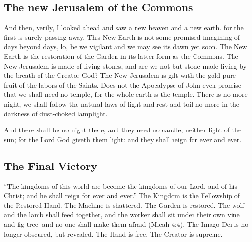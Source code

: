 \subsection{The new Jerusalem of the Commons}

And then, verily, I looked ahead and saw a new heaven and a new earth. for the first is surely passing away.
This New Earth is not some promised imagining of days beyond days, lo, be we vigilant and we may see its dawn yet soon.
The New Earth is the restoration of the Garden in its latter form as the Commons.
The New Jerusalem is made of living stones, and are we not but stone made living by the breath of the Creator God?
The New Jerusalem is gilt with the gold-pure fruit of the labors of the Saints.
Does not the Apocalypse of John even promise that we shall need no temple, for the whole earth is the temple.
There is no more night, we shall follow the natural laws of light and rest and toil no more in the darkness of dust-choked lamplight.
\begin{scripture}[Rev. 22:5]
    And there shall be no night there; and they need no candle, neither light of the sun; for the Lord God giveth them light: and they shall reign for ever and ever.
\end{scripture}

\subsection{The Final Victory}
``The kingdoms of this world are become the kingdoms of our Lord, and of his Christ; and he shall reign for ever and ever.''  The Kingdom is the Fellowship of the Restored Hand. The Machine is shattered. The Garden is restored. The wolf and the lamb shall feed together, and the worker shall sit under their own vine and fig tree, and no one shall make them afraid (Micah 4:4).
The Imago Dei is no longer obscured, but revealed.
The Hand is free.
The Creator is supreme.
